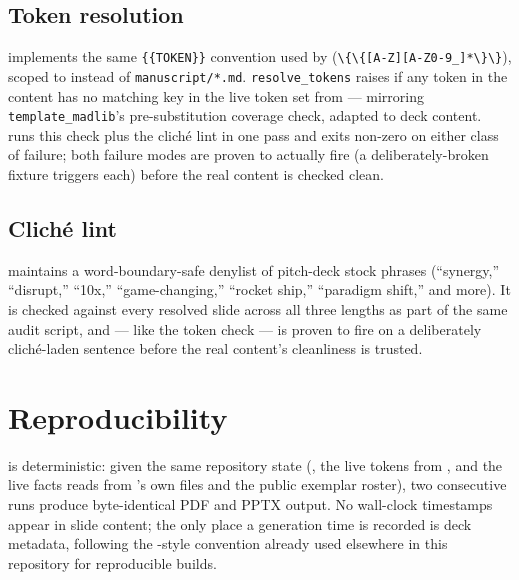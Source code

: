 \documentclass[
  english,
]{article}
\begin{document}
\subsection{Token resolution}\label{token-resolution}

 implements the same
\texttt{\{\{TOKEN\}\}} convention used by
(\texttt{\textbackslash{}\{\textbackslash{}\{{[}A-Z{]}{[}A-Z0-9\_{]}*\textbackslash{}\}\textbackslash{}\}}),
scoped to  instead of
\texttt{manuscript/*.md}. \texttt{resolve\_tokens} raises if any token
in the content has no matching key in the live token set from
 --- mirroring \texttt{template\_madlib}'s
 pre-substitution
coverage check, adapted to deck content.
 runs this check plus the cliché
lint in one pass and exits non-zero on either class of failure; both
failure modes are proven to actually fire (a deliberately-broken fixture
triggers each) before the real content is checked clean.

\subsection{Cliché lint}\label{clichuxe9-lint}

 maintains a word-boundary-safe denylist of
pitch-deck stock phrases (``synergy,'' ``disrupt,'' ``10x,''
``game-changing,'' ``rocket ship,'' ``paradigm shift,'' and more). It is
checked against every resolved slide across all three lengths as part of
the same audit script, and --- like the token check --- is proven to
fire on a deliberately cliché-laden sentence before the real content's
cleanliness is trusted.

\newpage

\section{Reproducibility}\label{sec:reproducibility}

 is deterministic: given the same
repository state (, the live
tokens from , and the live facts
 reads from 's
own files and the public exemplar roster), two consecutive runs produce
byte-identical PDF and PPTX output. No wall-clock timestamps appear in
slide content; the only place a generation time is recorded is deck
metadata, following the -style
convention already used elsewhere in this repository for reproducible
builds.
\end{document}
